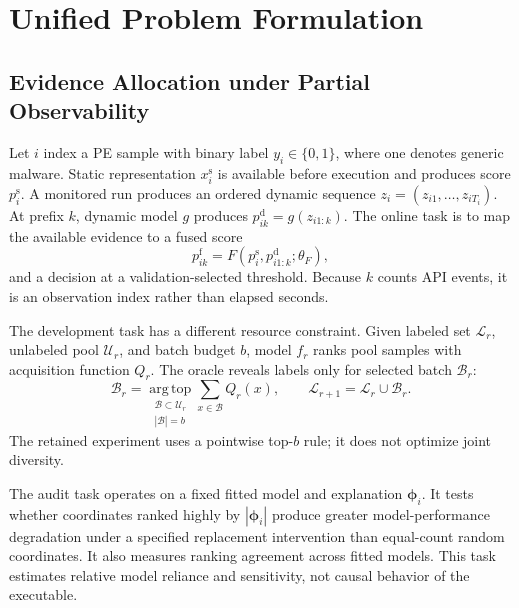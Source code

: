 \section{Unified Problem Formulation}
\label{sec:problem}

\subsection{Evidence Allocation under Partial Observability}

Let $i$ index a PE sample with binary label $y_i\in\{0,1\}$, where one denotes
generic malware. Static representation $x_i^{\mathrm{s}}$ is available before
execution and produces score $p_i^{\mathrm{s}}$. A monitored run produces an
ordered dynamic sequence
$z_i=(z_{i1},\ldots,z_{iT_i})$. At prefix $k$, dynamic model $g$ produces
$p_{ik}^{\mathrm{d}}=g(z_{i1:k})$. The online task is to map the available
evidence to a fused score
\begin{equation}
p_{ik}^{\mathrm{f}}=
F\!\left(p_i^{\mathrm{s}},p_{i1:k}^{\mathrm{d}};\theta_F\right),
\label{eq:online-object}
\end{equation}
and a decision at a validation-selected threshold. Because $k$ counts API
events, it is an observation index rather than elapsed seconds.

The development task has a different resource constraint. Given labeled set
$\mathcal{L}_r$, unlabeled pool $\mathcal{U}_r$, and batch budget $b$, model
$f_r$ ranks pool samples with acquisition function $Q_r$. The oracle reveals
labels only for selected batch $\mathcal{B}_r$:
\begin{equation}
\mathcal{B}_r=\operatorname*{arg\,top}_{\substack{
\mathcal{B}\subset\mathcal{U}_r\\|\mathcal{B}|=b}}
\sum_{x\in\mathcal{B}}Q_r(x),
\qquad
\mathcal{L}_{r+1}=\mathcal{L}_r\cup\mathcal{B}_r.
\label{eq:batch-object}
\end{equation}
The retained experiment uses a pointwise top-$b$ rule; it does not optimize
joint diversity.

The audit task operates on a fixed fitted model and explanation
$\boldsymbol{\phi}_i$. It tests whether coordinates ranked highly by
$|\boldsymbol{\phi}_i|$ produce greater model-performance degradation under a
specified replacement intervention than equal-count random coordinates. It also
measures ranking agreement across fitted models. This task estimates relative
model reliance and sensitivity, not causal behavior of the executable.

